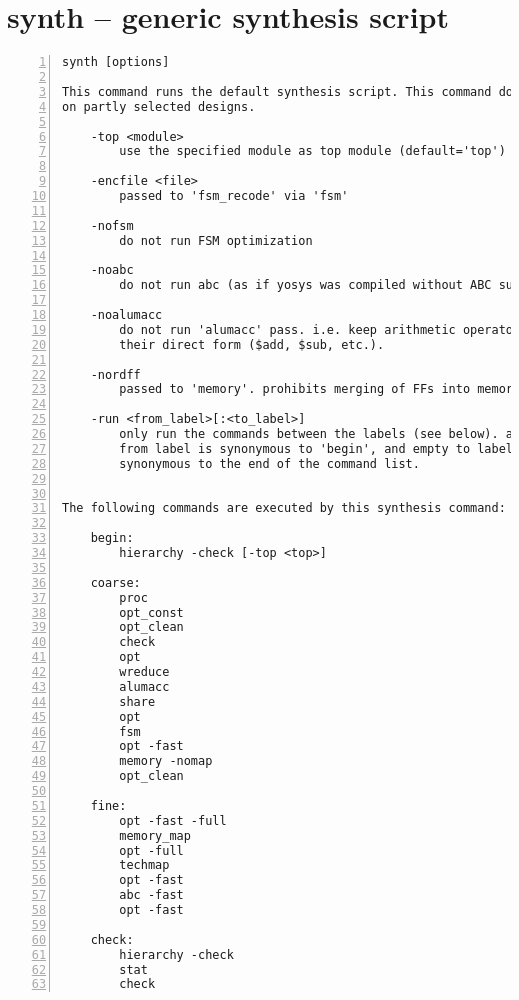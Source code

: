 \section{synth -- generic synthesis script}
\label{cmd:synth}
\begin{lstlisting}[numbers=left,frame=single]
    synth [options]

This command runs the default synthesis script. This command does not operate
on partly selected designs.

    -top <module>
        use the specified module as top module (default='top')

    -encfile <file>
        passed to 'fsm_recode' via 'fsm'

    -nofsm
        do not run FSM optimization

    -noabc
        do not run abc (as if yosys was compiled without ABC support)

    -noalumacc
        do not run 'alumacc' pass. i.e. keep arithmetic operators in
        their direct form ($add, $sub, etc.).

    -nordff
        passed to 'memory'. prohibits merging of FFs into memory read ports

    -run <from_label>[:<to_label>]
        only run the commands between the labels (see below). an empty
        from label is synonymous to 'begin', and empty to label is
        synonymous to the end of the command list.


The following commands are executed by this synthesis command:

    begin:
        hierarchy -check [-top <top>]

    coarse:
        proc
        opt_const
        opt_clean
        check
        opt
        wreduce
        alumacc
        share
        opt
        fsm
        opt -fast
        memory -nomap
        opt_clean

    fine:
        opt -fast -full
        memory_map
        opt -full
        techmap
        opt -fast
        abc -fast
        opt -fast

    check:
        hierarchy -check
        stat
        check
\end{lstlisting}


